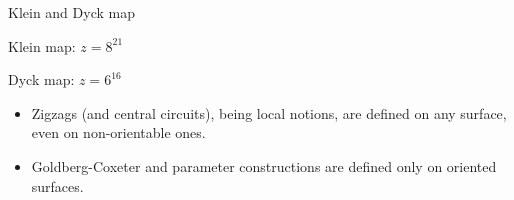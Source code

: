\documentclass[%
pdf,
colorBG,
slideColor,
]{prosper}
\begin{document}
\begin{slide}{Klein and Dyck map}
\begin{center}
\setlength{\unitlength}{1cm}
\begin{minipage}[t]{5.0cm}
\centering
{}\par
Klein map: $z=8^{21}$
\end{minipage}
\hfill
\begin{minipage}[t]{4.0cm}
\centering
{}\par
Dyck map: $z=6^{16}$
\end{minipage}
\end{center}

\vspace{3mm}
\begin{itemize}
\item Zigzags (and central circuits), being local notions, are defined on any surface, even on non-orientable ones.
\item Goldberg-Coxeter and parameter constructions are defined only on oriented surfaces.
\end{itemize} 

\end{slide}
\end{document}
